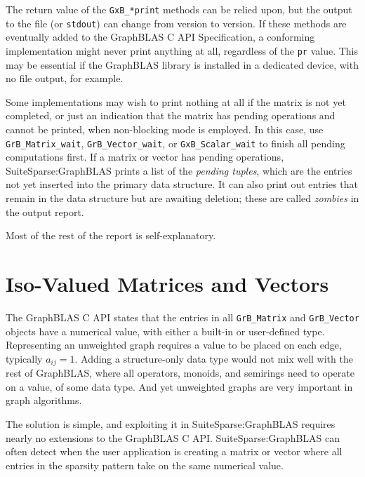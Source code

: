 \documentclass[12pt]{article}
\begin{document}
The return value of the \verb'GxB_*print' methods can be relied upon, but the
output to the file (or \verb'stdout') can change from version to version.  If
these methods are eventually added to the GraphBLAS C API Specification, a
conforming implementation might never print anything at all, regardless of the
\verb'pr' value.  This may be essential if the GraphBLAS library is installed
in a dedicated device, with no file output, for example.

Some implementations may wish to print nothing at all if the matrix is not yet
completed, or just an indication that the matrix has pending operations and
cannot be printed, when non-blocking mode is employed.  In this case, use
\verb'GrB_Matrix_wait', \verb'GrB_Vector_wait', or \verb'GxB_Scalar_wait' to
finish all pending computations first.  If a matrix or vector has pending
operations, SuiteSparse:GraphBLAS prints a list of the {\em pending tuples},
which are the entries not yet inserted into the primary data structure.  It can
also print out entries that remain in the data structure but are awaiting
deletion; these are called {\em zombies} in the output report.

Most of the rest of the report is self-explanatory.

\newpage
\section{Iso-Valued Matrices and Vectors } %
\label{iso}

The GraphBLAS C API states that the entries in all \verb'GrB_Matrix' and
\verb'GrB_Vector' objects have a numerical value, with either a built-in or
user-defined type.  Representing an unweighted graph requires a value to be
placed on each edge, typically $a_{ij}=1$.  Adding a structure-only data type
would not mix well with the rest of GraphBLAS, where all operators, monoids,
and semirings need to operate on a value, of some data type.  And yet
unweighted graphs are very important in graph algorithms.

The solution is simple, and exploiting it in SuiteSparse:GraphBLAS requires
nearly no extensions to the GraphBLAS C API.   SuiteSparse:GraphBLAS can often
detect when the user application is creating a matrix or vector where all
entries in the sparsity pattern take on the same numerical value.
\end{document}
